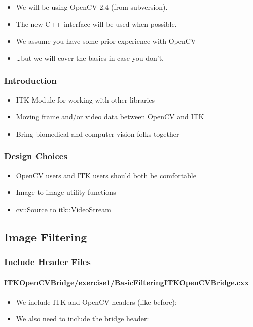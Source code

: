 \begin{frame}
\begin{center}
\begin{columns}[c]
\end{columns}
\pause
\begin{itemize}
\item We will be using OpenCV 2.4 (from subversion).
\item The new C++ interface will be used when possible.
\item We assume you have some prior experience with OpenCV
\item \ldots but we will cover the basics in case you don't.
\end{itemize}
\end{center}
\end{frame}



\begin{frame}
\frametitle{Introduction}
\begin{itemize}
\item ITK Module for working with other libraries
\item Moving frame and/or video data between OpenCV and ITK
\item Bring biomedical and computer vision folks together
\end{itemize}
\end{frame}



\begin{frame}
\frametitle{Design Choices}
\begin{itemize}
\item OpenCV users and ITK users should both be comfortable
\item Image to image utility functions
\item cv::Source to itk::VideoStream
\end{itemize}
\end{frame}

\subsection{Image Filtering}


\begin{frame}
\frametitle{Include Header Files}
\framesubtitle{ITKOpenCVBridge/exercise1/BasicFilteringITKOpenCVBridge.cxx}
\begin{itemize}
\item We include ITK and OpenCV headers (like before):
\item We also need to include the bridge header:
\end{itemize}
\end{frame}

